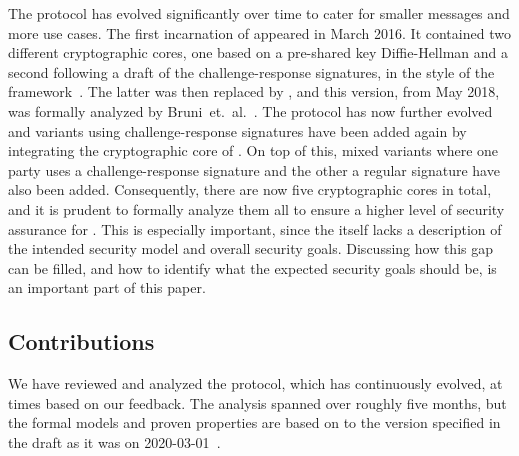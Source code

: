 \documentclass[runningheads,draft,x11names]{llncs}
\begin{document}
The \mEdhoc{} protocol has evolved significantly over time to cater for smaller
messages and more use cases.
%
The first incarnation of \mEdhoc{} appeared in March 2016.
%
It contained two different cryptographic cores, one based on a
pre-shared key Diffie-Hellman and a second following a draft of the
challenge-response signatures, in the style of the \mNoise{}
framework~\cite{perrin2016noise}.
%
The latter was then replaced by \mSigma, and this version, from May 2018, was
formally analyzed by Bruni~et.~al.~\cite{DBLP:conf/secsr/BruniJPS18}.
%
The protocol has now further evolved and variants using challenge-response
signatures have been added again by integrating the cryptographic core of
\mOptls{}.
%
On top of this, mixed variants where one party uses a challenge-response
signature and the other a regular signature have also been added.
%
Consequently, there are now five cryptographic cores in total, and it is prudent
to formally analyze them all to ensure a higher level of security assurance for
\mEdhoc.
%
This is especially important, since the \mSpec{} itself lacks a description
of the intended security model and overall security goals.
%
Discussing how this gap can be filled, and how to identify what the expected
security goals should be, is an important part of this paper.
%

\subsection{Contributions}
\label{sec:contributions}
We have reviewed and analyzed the \mEdhoc{} protocol, which has continuously
evolved, at times based on our feedback.
%
The analysis spanned over roughly five months, but the formal models and proven
properties are based on to the version specified in the draft as it was on
2020-03-01~\cite{selander-lake-edhoc-01}.
%
\end{document}
